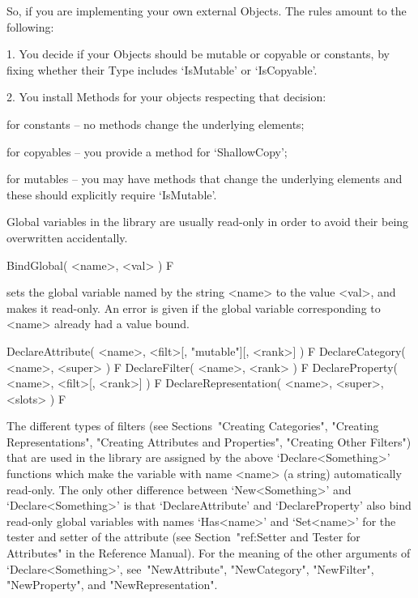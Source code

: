 So, if you are implementing your own external Objects. The rules amount to the
following:

\beginlist%

\item{1.}
You decide if your Objects should be mutable or copyable or constants, by
fixing whether their Type includes `IsMutable' or `IsCopyable'.

\item{2.}
You install Methods for your objects respecting that decision:

\itemitem{$\bullet$}%
for constants -- no methods change the underlying elements;

\itemitem{$\bullet$}
for copyables -- you provide a method for `ShallowCopy';

\itemitem{$\bullet$}
for mutables  -- you may have methods that change the underlying elements
and these should explicitly require `IsMutable'.

\endlist


Global variables in the {\GAP} library are usually read-only in order to
avoid their being overwritten accidentally.

\>BindGlobal( <name>, <val> ) F

sets the global variable named by the string <name> to the value <val>,
and makes it read-only.
An error is given if the global variable corresponding to <name>
already had a value bound.

\>DeclareAttribute( <name>, <filt>[, "mutable"][, <rank>] ) F
\>DeclareCategory( <name>, <super> ) F
\>DeclareFilter( <name>, <rank> ) F
\>DeclareProperty( <name>, <filt>[, <rank>] ) F
\>DeclareRepresentation( <name>, <super>, <slots> ) F

The different types of filters (see Sections~"Creating Categories",
"Creating Representations", "Creating Attributes and Properties",
"Creating Other Filters") that are used in the {\GAP} library are
assigned by the above `Declare<Something>' functions which make the
variable with name <name> (a string) automatically read-only.
The only other difference between `New<Something>' and
`Declare<Something>' is that `DeclareAttribute' and `DeclareProperty'
also bind read-only global variables with names `Has<name>' and `Set<name>'
for the tester and setter of the attribute
(see Section~"ref:Setter and Tester for Attributes" in the Reference Manual).
For the meaning of the other arguments of `Declare<Something>',
see~"NewAttribute", "NewCategory", "NewFilter", "NewProperty", and
"NewRepresentation".

